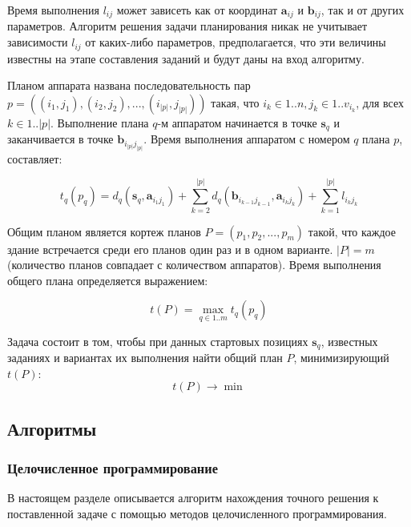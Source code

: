 \documentclass[a4paper,14pt,russian]{article}
\begin{document}
Время выполнения $l_{i j}$ может зависеть как от координат $\mathbf{a}_{i j}$ и $\mathbf{b}_{i j}$, так и от других параметров. Алгоритм решения задачи планирования никак не учитывает зависимости $l_{i j}$ от каких-либо параметров, предполагается, что эти величины известны на этапе составления заданий и будут даны на вход алгоритму.

Планом аппарата названа последовательность пар \\ $p = ((i_1, j_1), (i_2, j_2), ..., (i_{|p|}, j_{|p|}))$ такая, что $i_k \in 1..n, j_k \in 1..v_{i_k}$, для всех $k \in 1..|p|$. Выполнение плана $q$-м аппаратом начинается в точке $\mathbf{s}_q$ и заканчивается в точке $\mathbf{b}_{i_{|p|} j_{|p|}}$. Время выполнения аппаратом с номером $q$ плана $p$, составляет:

\begin{equation} \label{varm1}
t_q(p_q) = d_q(\mathbf{s}_q, \mathbf{a}_{i_1 j_1}) + \sum_{k=2}^{|p|} d_q(\mathbf{b}_{i_{k-1} j_{k - 1}}, \mathbf{a}_{i_k j_k}) + \sum_{k=1}^{|p|}l_{i_k j_k}
\end{equation}

Общим планом является кортеж планов $P = (p_1, p_2, ..., p_m)$ такой, что каждое здание встречается среди его планов один раз и в одном варианте. $|P| = m$ (количество планов совпадает с количеством аппаратов). Время выполнения общего плана определяется выражением:

\begin{equation} \label{varm2}
t(P) = \displaystyle \max_{q \in 1..m} t_q(p_q)
\end{equation}

Задача состоит в том, чтобы при данных стартовых позициях $\mathbf{s}_q$, известных заданиях и вариантах их выполнения найти общий план $P$, минимизирующий $t(P)$:
\begin{equation} \label{varm3}
t(P) \rightarrow \min
\end{equation}


\subsection{Алгоритмы}
\subsubsection{Целочисленное программирование}

В настоящем разделе описывается алгоритм нахождения точного решения к поставленной задаче с помощью методов целочисленного программирования.
\end{document}
